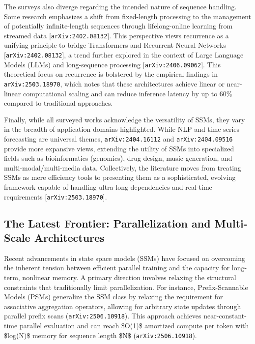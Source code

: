 \documentclass[11pt]{article}
\begin{document}
The surveys also diverge regarding the intended nature of sequence handling. Some research emphasizes a shift from fixed-length processing to the management of potentially infinite-length sequences through lifelong-online learning from streamed data [\texttt{arXiv:2402.08132}]. This perspective views recurrence as a unifying principle to bridge Transformers and Recurrent Neural Networks [\texttt{arXiv:2402.08132}], a trend further explored in the context of Large Language Models (LLMs) and long-sequence processing [\texttt{arXiv:2406.09062}]. This theoretical focus on recurrence is bolstered by the empirical findings in \texttt{arXiv:2503.18970}, which notes that these architectures achieve linear or near-linear computational scaling and can reduce inference latency by up to 60\% compared to traditional approaches.

Finally, while all surveyed works acknowledge the versatility of SSMs, they vary in the breadth of application domains highlighted. While NLP and time-series forecasting are universal themes, \texttt{arXiv:2404.16112} and \texttt{arXiv:2404.09516} provide more expansive views, extending the utility of SSMs into specialized fields such as bioinformatics (genomics), drug design, music generation, and multi-modal/multi-media data. Collectively, the literature moves from treating SSMs as mere efficiency tools to presenting them as a sophisticated, evolving framework capable of handling ultra-long dependencies and real-time requirements [\texttt{arXiv:2503.18970}].

\subsection{The Latest Frontier: Parallelization and Multi-Scale Architectures}

Recent advancements in state space models (SSMs) have focused on overcoming the inherent tension between efficient parallel training and the capacity for long-term, nonlinear memory. A primary direction involves relaxing the structural constraints that traditionally limit parallelization. For instance, Prefix-Scannable Models (PSMs) generalize the SSM class by relaxing the requirement for associative aggregation operators, allowing for arbitrary state updates through parallel prefix scans (\texttt{arXiv:2506.10918}). This approach achieves near-constant-time parallel evaluation and can reach \$O(1)\$ amortized compute per token with \$log(N)\$ memory for sequence length \$N\$ (\texttt{arXiv:2506.10918}).
\end{document}
